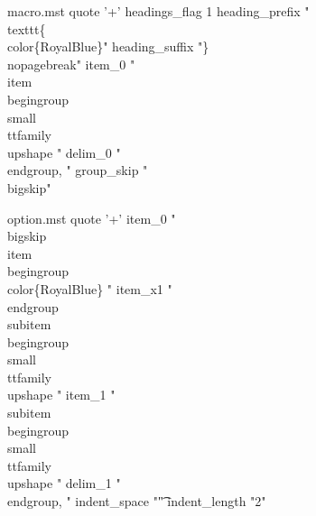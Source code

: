 % 
% 
% 

\begin{filecontents*}{macro.mst}
quote '+'
headings_flag 1
heading_prefix "\\texttt\{\\color\{RoyalBlue\}"
heading_suffix "\}\\nopagebreak\n"
item_0 "\n \\item \\begingroup \\small \\ttfamily \\upshape "
delim_0 "\\endgroup, "
group_skip "\n\n  \\bigskip\n"
\end{filecontents*}

\begin{filecontents*}{option.mst}
quote '+'
item_0 "\n \\bigskip \\item \\begingroup \\color\{RoyalBlue\} "
item_x1 " \\endgroup \n \\subitem \\begingroup \\small \\ttfamily \\upshape "
item_1 "\n \\subitem \\begingroup \\small \\ttfamily \\upshape "
delim_1 "\\endgroup, "
indent_space "\t"
indent_length "2"
\end{filecontents*}


\documentclass[final,british,10pt]{scrartcl}
	\reversemarginpar
\RequirePackage[british]{babel}
\RequirePackage{fontspec}
\RequirePackage[style=english,english=british]{csquotes}
\RequirePackage{xcolor}

